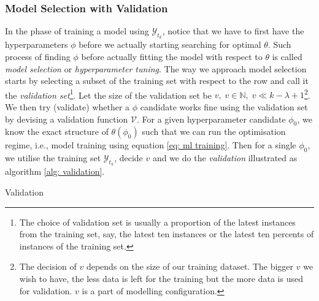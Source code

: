 \subsubsection{Model Selection with Validation}
In the phase of training a model using $\mathcal{Y}_{t_k}$, notice that we have to first have the hyperparameters $\phi$ before we actually starting searching for optimal $\theta$. Such process of finding $\phi$ before actually fitting the model with respect to $\theta$ is called \textit{model selection} or \textit{hyperparameter tuning}. The way we approach model selection starts by selecting a subset of the training set with respect to the row and call it the \textit{validation set}\footnote{The choice of validation set is usually a proportion of the latest instances from the training set, say, the latest ten instances or the latest ten percents of instances of the training set.}. Let the size of the validation set be $v, \; v \in \mathbb{N}, \; v \ll k - \lambda + 1$\footnote{The decision of $v$ depends on the size of our training dataset. The bigger $v$ we wish to have, the less data is left for the training but the more data is used for validation. $v$ is a part of modelling configuration.}. We then try (validate) whether a $\phi$ candidate works fine using the validation set by devising a validation function $\mathcal{V}$. For a given hyperparameter candidate $\phi_0$, we know the exact structure of $\theta(\phi_0)$ such that we can run the optimisation regime, i.e., model training using equation \ref{eq: ml training}. Then for a single $\phi_0$, we utilise the training set $\mathcal{Y}_{t_k}$, decide $v$ and we do the \textit{validation} illustrated as algorithm \ref{alg: validation}.
\begin{algorithm}
    \caption{Validation}\label{alg: validation}
    \begin{algorithmic}
    \EndFor
    \end{algorithmic}
\end{algorithm}
